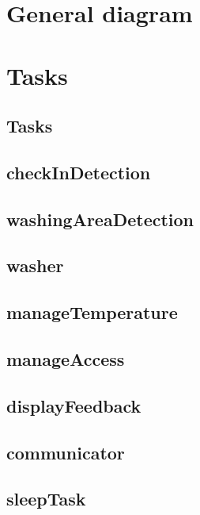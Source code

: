 \section{General diagram}
\section{Tasks}
\subsection{Tasks}
\subsection{checkInDetection}

\subsection{washingAreaDetection}

\subsection{washer}
\subsection{manageTemperature}
\subsection{manageAccess}

\subsection{displayFeedback}
\subsection{communicator}
\subsection{sleepTask}


